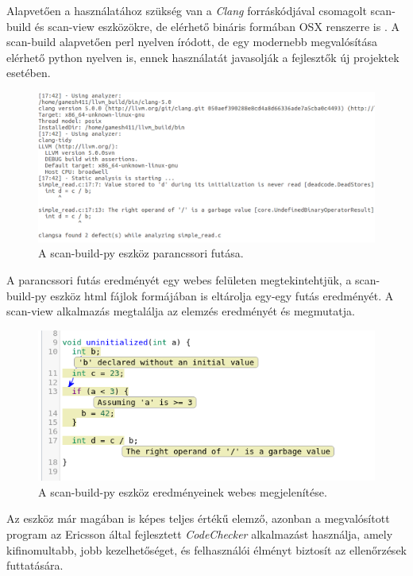 \documentclass[a4paper,12pt]{report}
\begin{document}
Alapvetően a használatához szükség van a \emph{Clang} forráskódjával csomagolt scan-build és scan-view eszközökre, de elérhető bináris formában OSX renszerre is \cite{clangsahomepage}. A scan-build alapvetően perl nyelven íródott, de egy modernebb megvalósítása elérhető python nyelven is, ennek használatát javasolják a fejlesztők új projektek esetében.

\begin{figure}[h]
\caption{A scan-build-py eszköz parancssori futása.}
\centering
\includegraphics[scale=0.4]{uninit_commandline.png}
\end{figure}

A parancssori futás eredményét egy webes felületen megtekintehtjük, a scan-build-py eszköz html fájlok formájában is eltárolja egy-egy futás eredményét. A scan-view alkalmazás megtalálja az elemzés eredményét és megmutatja.

\begin{figure}[h]
\caption{A scan-build-py eszköz eredményeinek webes megjelenítése.}
\centering
\includegraphics[scale=0.8]{uninit_web.png}
\end{figure}

Az eszköz már magában is képes teljes értékű elemző, azonban a megvalósított program az Ericsson által fejlesztett \emph{CodeChecker} \cite{codecheckergit} alkalmazást használja, amely kifinomultabb, jobb kezelhetőséget, és felhasználói élményt biztosít az ellenőrzések futtatására.
\end{document}
